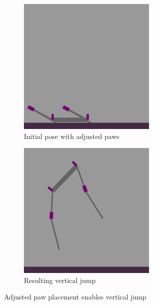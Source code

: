 \begin{figure}[h]
    \centering
    \begin{subfigure}[b]{0.48\textwidth}
        \centering
        \includegraphics[width=\textwidth]{Images/link_length_optimization/adjusted_paw_pose.png}
        \caption{Initial pose with adjusted paws}
    \end{subfigure}
    \hfill
    \begin{subfigure}[b]{0.48\textwidth}
        \centering
        \includegraphics[width=\textwidth]{Images/link_length_optimization/adjusted_paw_jump.png}
        \caption{Resulting vertical jump}
    \end{subfigure}
    \caption{Adjusted paw placement enables vertical jump}
    \label{fig:link_length_optimization:adjusted_jump}
\end{figure}


